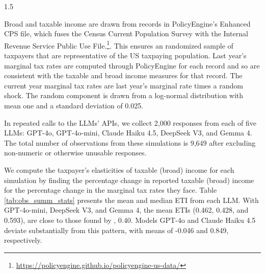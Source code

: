 \documentclass[letterpaper,9pt]{article}
\theoremstyle{definition}
\begin{document}
\begin{spacing}{1.5}
   \vspace{0.8cm}
  
Broad and taxable income are drawn from records in PolicyEngine's Enhanced CPS file, which fuses the Census Current Population Survey with the Internal Revenue Service Public Use File.\footnote{\url{https://policyengine.github.io/policyengine-us-data/}}. This ensures an randomized sample of taxpayers that are representative of the US taxpaying population. Last year's marginal tax rates are computed through PolicyEngine for each record and so are consistent with the taxable and broad income measures for that record. The current year marginal tax rates are last year's marginal rate times a random shock. The random component is drawn from a log-normal distribution with mean one and a standard deviation of 0.025.

In repeated calls to the LLMs' APIs, we collect 2,000 responses from each of five LLMs: GPT-4o, GPT-4o-mini, Claude Haiku 4.5, DeepSeek V3, and Gemma 4.  The total number of observations from these simulations is 9,649 after excluding non-numeric or otherwise unusable responses.

We compute the taxpayer's elasticities of taxable (broad) income for each simulation by finding the percentage change in reported taxable (broad) income for the percentage change in the marginal tax rates they face.  Table \ref{tab:obs_summ_stats} presents the mean and median ETI from each LLM.  With GPT-4o-mini, DeepSeek V3, and Gemma 4, the mean ETIs (0.462, 0.428, and 0.593), are close to those found by \cite{GruberSaez2002}, 0.40. Models GPT-4o and Claude Haiku 4.5 deviate substantially from this pattern, with means of -0.046 and 0.849, respectively.


\end{spacing}
\end{document}
